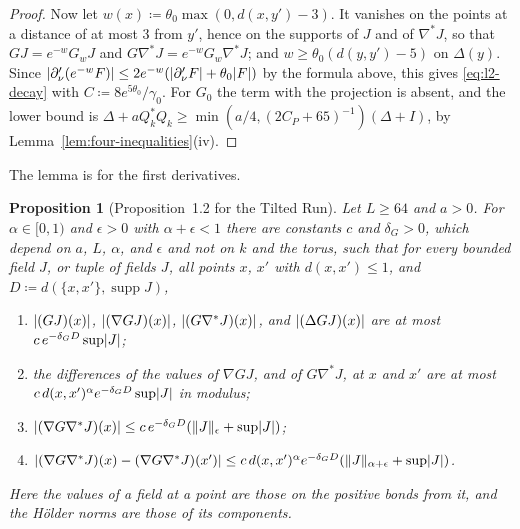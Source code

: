 \documentclass[11pt]{preprint}
\DeclarePairedDelimiter{\abs}{\lvert}{\rvert}
\DeclarePairedDelimiter{\norm}{\lVert}{\rVert}
\numberwithin{equation}{section}
\newtheorem{proposition}[theorem]{Proposition}
\theoremstyle{definition}
\theoremstyle{remark}
\theoremstyle{plain}
\begin{document}
\begin{proof}
Now let $w(x) \coloneqq \theta_0\max(0, d(x, y') - 3)$. It vanishes on the points at a distance of at most $3$ from $y'$, hence on the supports of $J$ and of $\nabla^*J$, so that $GJ = e^{-w}G_wJ$ and $G\nabla^*J = e^{-w}G_w\nabla^*J$; and $w \geq \theta_0(d(y, y') - 5)$ on $\Delta(y)$. Since $\abs{\partial'_\nu(e^{-w}F)} \leq 2e^{-w}(\abs{\partial'_\nu F} + \theta_0\abs F)$ by the formula above, this gives \eqref{eq:l2-decay} with $C \coloneqq 8e^{5\theta_0}/\gamma_0$. For $G_0$ the term with the projection is absent, and the lower bound is $\Delta + aQ_k^*Q_k \geq \min(a/4, (2C_P + 65)^{-1})(\Delta + I)$, by Lemma~\ref{lem:four-inequalities}(iv).
\end{proof}

The lemma is \cite[(1.114)]{BalabanPRT1} for the first derivatives.

\begin{proposition}[Proposition~1.2 for the Tilted Run]\label{prop:one-two}
Let $L \geq 64$ and $a > 0$. For $\alpha \in [0, 1)$ and $\epsilon > 0$ with $\alpha + \epsilon < 1$ there are constants $c$ and $\delta_G > 0$, which depend on $a$, $L$, $\alpha$, and $\epsilon$ and not on $k$ and the torus, such that for every bounded field $J$, or tuple of fields $J$, all points $x$, $x'$ with $d(x, x') \leq 1$, and $D \coloneqq d(\{ x, x' \}, \operatorname{supp}J)$,
\begin{enumerate}[label=(\roman*)]
\item $\abs{(GJ)(x)}$, $\abs{(\nabla GJ)(x)}$, $\abs{(G\nabla^*J)(x)}$, and $\abs{(\Delta GJ)(x)}$ are at most $c\,e^{-\delta_GD}\sup\abs J$;
\item the differences of the values of $\nabla GJ$, and of $G\nabla^*J$, at $x$ and $x'$ are at most $c\,d(x, x')^\alpha e^{-\delta_GD}\sup\abs J$ in modulus;
\item $\abs{(\nabla G\nabla^*J)(x)} \leq c\,e^{-\delta_GD}(\norm{J}_\epsilon + \sup\abs J)$;
\item $\abs{(\nabla G\nabla^*J)(x) - (\nabla G\nabla^*J)(x')} \leq c\,d(x, x')^\alpha e^{-\delta_GD}(\norm{J}_{\alpha+\epsilon} + \sup\abs J)$.
\end{enumerate}
Here the values of a field at a point are those on the positive bonds from it, and the H\"older norms are those of its components.
\end{proposition}
\end{document}
